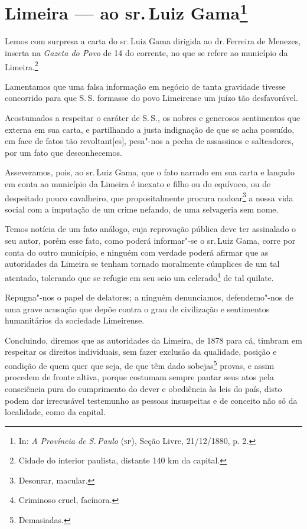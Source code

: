 \chapter{Limeira --- ao sr.\,Luiz Gama\footnote[*]{In: \emph{A Província de S.\,Paulo} (\textsc{sp}), Seção Livre, 21/12/1880, p. 2.}}


Lemos com surpresa a carta do sr.\,Luiz Gama dirigida ao dr.\,Ferreira de
Menezes, inserta na \emph{Gazeta do Povo} de 14 do corrente, no que se
refere ao município da Limeira.\footnote{Cidade do interior paulista,
  distante 140 km da capital.}

Lamentamos que uma falsa informação em negócio de tanta gravidade
tivesse concorrido para que S.\,S. formasse do povo Limeirense um juízo
tão desfavorável.

Acostumados a respeitar o caráter de S.\,S., os nobres e generosos
sentimentos que externa em sua carta, e partilhando a justa indignação
de que se acha possuído, em face de fatos tão revoltant{[}es{]},
pesa"-nos a pecha de assassinos e salteadores, por um fato que
desconhecemos.

Asseveramos, pois, ao sr.\,Luiz Gama, que o fato narrado em sua carta e
lançado em conta ao município da Limeira é inexato e filho ou do
equívoco, ou de despeitado pouco cavalheiro, que propositalmente procura
nodoar\footnote{Desonrar, macular.} a nossa vida social com a
imputação de um crime nefando, de uma selvageria sem nome.

Temos notícia de um fato análogo, cuja reprovação pública deve ter
assinalado o seu autor, porém esse fato, como poderá informar"-se o sr.\,Luiz Gama, corre por conta do outro município, e ninguém com verdade
poderá afirmar que as autoridades da Limeira se tenham tornado
moralmente cúmplices de um tal atentado, tolerando que se refugie em seu
seio um celerado\footnote{Criminoso cruel, facínora.} de tal quilate.

Repugna"-nos o papel de delatores; a ninguém denunciamos, defendemo"-nos
de uma grave acusação que depõe contra o grau de civilização e
sentimentos humanitários da sociedade Limeirense.

Concluindo, diremos que as autoridades da Limeira, de 1878 para cá,
timbram em respeitar os direitos individuais, sem fazer exclusão da
qualidade, posição e condição de quem quer que seja, de que têm dado
sobejas\footnote{Demasiadas.} provas, e assim procedem de fronte
altiva, porque costumam sempre pautar seus atos pela consciência pura do
cumprimento do dever e obediência às leis do país, disto podem dar
irrecusável testemunho as pessoas insuspeitas e de conceito não só da
localidade, como da capital.


